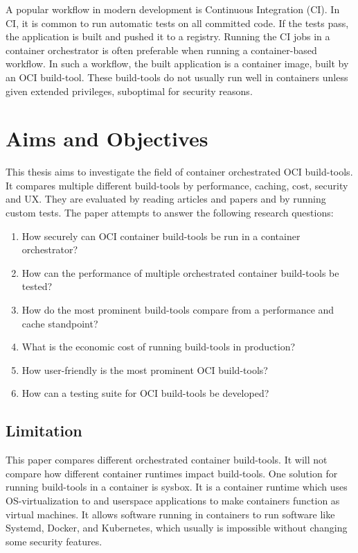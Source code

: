 A popular workflow in modern development is Continuous Integration (CI)\cite{continuous_integration}. In CI, it is common to run automatic tests on all committed code. If the tests pass, the application is built and pushed it to a registry. Running the CI jobs in a container orchestrator is often preferable\cite{ci_containers} when running a container-based workflow. In such a workflow, the built application is a container image, built by an OCI build-tool. These build-tools do not usually run well in containers unless given extended privileges, suboptimal for security reasons. 


\section{Aims and Objectives}
This thesis aims to investigate the field of container orchestrated OCI build-tools. It compares multiple different build-tools by performance, caching, cost, security and UX. They are evaluated by reading articles and papers and by running custom tests. The paper attempts to answer the following research questions:

\begin{enumerate}
    \item How securely can OCI container build-tools be run in a container orchestrator?
    \item How can the performance of multiple orchestrated container build-tools be tested?
    \item How do the most prominent build-tools compare from a performance and cache standpoint?
    \item What is the economic cost of running build-tools in production?
    \item How user-friendly is the most prominent OCI build-tools?
    \item How can a testing suite for OCI build-tools be developed?
\end{enumerate}

\subsection{Limitation}
This paper compares different orchestrated container build-tools. It will not compare how different container runtimes impact build-tools. One solution for running build-tools in a container is sysbox\cite{sysbox}. It is a container runtime which uses OS-virtualization to and userspace applications to make containers function as virtual machines. It allows software running in containers to run software like Systemd, Docker, and Kubernetes, which usually is impossible without changing some security features. 

